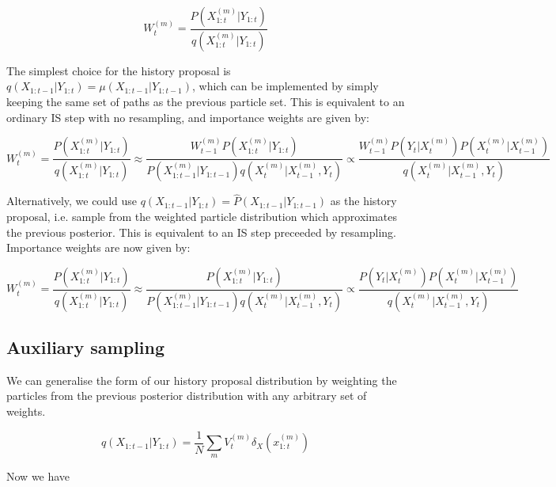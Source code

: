 \begin{equation}
W_t^{(m)} = \frac{P(X_{1:t}^{(m)}|Y_{1:t})}{q(X_{1:t}^{(m)}|Y_{1:t})}
\label{eq:ImportanceWeights}
\end{equation}

The simplest choice for the history proposal is $q(X_{1:t-1}|Y_{1:t}) = \mu(X_{1:t-1}|Y_{1:t-1})$, which can be implemented by simply keeping the same set of paths as the previous particle set. This is equivalent to an ordinary IS step with no resampling, and importance weights are given by:

\begin{equation}
W_t^{(m)} = \frac{P(X_{1:t}^{(m)}|Y_{1:t})}{q(X_{1:t}^{(m)}|Y_{1:t})}
\approx \frac{W_{t-1}^{(m)}P(X_{1:t}^{(m)}|Y_{1:t})}{P(X_{1:t-1}^{(m)}|Y_{1:t-1}) q(X_{t}^{(m)}|X_{t-1}^{(m)}, Y_{t})}
\propto \frac{W_{t-1}^{(m)} P(Y_t|X_t^{(m)})P(X_t^{(m)}|X_{t-1}^{(m)})}{q(X_t^{(m)}|X_{t-1}^{(m)}, Y_t)}
\label{eq:NoResampIW}
\end{equation}

Alternatively, we could use $q(X_{1:t-1}|Y_{1:t}) = \hat{P}(X_{1:t-1}|Y_{1:t-1})$ as the history proposal, i.e. sample from the weighted particle distribution which approximates the previous posterior. This is equivalent to an IS step preceeded by resampling. Importance weights are now given by:

\begin{equation}
W_t^{(m)} = \frac{P(X_{1:t}^{(m)}|Y_{1:t})}{q(X_{1:t}^{(m)}|Y_{1:t})}
\approx \frac{P(X_{1:t}^{(m)}|Y_{1:t})}{P(X_{1:t-1}^{(m)}|Y_{1:t-1}) q(X_{t}^{(m)}|X_{t-1}^{(m)}, Y_{t})}
\propto \frac{ P(Y_t|X_t^{(m)})P(X_t^{(m)}|X_{t-1}^{(m)})}{q(X_t^{(m)}|X_{t-1}^{(m)}, Y_t)}
\label{eq:WithResampIW}
\end{equation}


\subsection{Auxiliary sampling}

We can generalise the form of our history proposal distribution by weighting the particles from the previous posterior distribution with any arbitrary set of weights.

\begin{equation}
q(X_{1:t-1}|Y_{1:t}) = \frac{1}{N} \sum_m {V_t^{(m)} \delta_{X} (x_{1:t}^{(m)})}
\label{eq:AuxiliarySamplingProposal}
\end{equation}

Now we have

